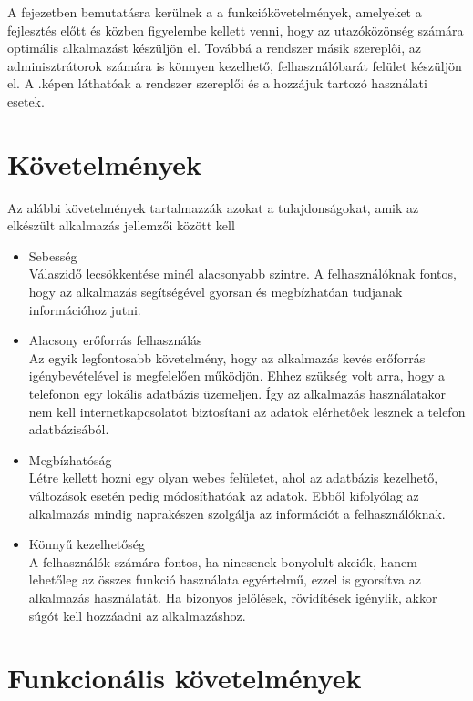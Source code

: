 
A fejezetben bemutatásra kerülnek a a funkciókövetelmények, amelyeket a fejlesztés előtt és közben figyelembe kellett venni, hogy az utazóközönség számára optimális alkalmazást készüljön el. 
Továbbá a rendszer másik szereplői, az adminisztrátorok számára is könnyen kezelhető, felhasználóbarát felület készüljön el. 
A .képen láthatóak a rendszer szereplői és a hozzájuk tartozó használati esetek. 


\section{Követelmények}
\label{kovetelmeny}

Az alábbi követelmények tartalmazzák azokat a tulajdonságokat, amik az elkészült alkalmazás jellemzői között kell

\begin{itemize}
	\item Sebesség
	\\
	Válaszidő lecsökkentése minél alacsonyabb szintre. 
	A felhasználóknak fontos, hogy az alkalmazás segítségével gyorsan és megbízhatóan tudjanak információhoz jutni. 
	\item Alacsony erőforrás felhasználás
	\\
	Az egyik legfontosabb követelmény, hogy az alkalmazás kevés erőforrás igénybevételével is megfelelően működjön. 
	Ehhez szükség volt arra, hogy a telefonon egy lokális adatbázis üzemeljen. 
	Így az alkalmazás használatakor nem kell internetkapcsolatot biztosítani az adatok elérhetőek lesznek a telefon adatbázisából.	
	\item Megbízhatóság
	\\
	Létre kellett hozni egy olyan webes felületet, ahol az adatbázis kezelhető, változások esetén pedig módosíthatóak az adatok. 
	Ebből kifolyólag az alkalmazás mindig naprakészen szolgálja az információt a felhasználóknak.
	\item Könnyű kezelhetőség
	\\
	A felhasználók számára fontos, ha nincsenek bonyolult akciók, hanem lehetőleg az összes funkció használata egyértelmű, ezzel is gyorsítva az alkalmazás használatát. 
	Ha bizonyos jelölések, rövidítések igénylik, akkor súgót kell hozzáadni az alkalmazáshoz.
	
\end{itemize}


\section{Funkcionális követelmények}
\label{funkckov}

